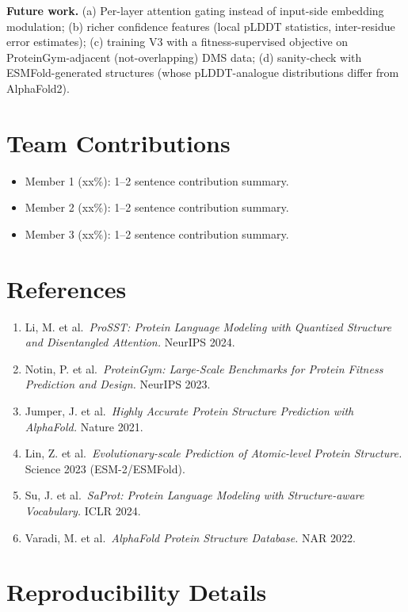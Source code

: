\documentclass[11pt,a4paper]{article}
\begin{document}
\textbf{Future work.} (a) Per-layer attention gating instead of input-side
embedding modulation; (b) richer confidence features (local pLDDT
statistics, inter-residue error estimates); (c) training V3 with a
fitness-supervised objective on ProteinGym-adjacent (not-overlapping)
DMS data; (d) sanity-check with ESMFold-generated structures (whose
pLDDT-analogue distributions differ from AlphaFold2).

\section*{Team Contributions}
\begin{itemize}[leftmargin=*]
    \item Member 1 (xx\%): 1--2 sentence contribution summary.
    \item Member 2 (xx\%): 1--2 sentence contribution summary.
    \item Member 3 (xx\%): 1--2 sentence contribution summary.
\end{itemize}

\section*{References}
\begin{enumerate}[leftmargin=*, itemsep=0pt]
    \item Li, M. et al.\ \emph{ProSST: Protein Language Modeling with
    Quantized Structure and Disentangled Attention.} NeurIPS 2024.
    \item Notin, P. et al.\ \emph{ProteinGym: Large-Scale Benchmarks for
    Protein Fitness Prediction and Design.} NeurIPS 2023.
    \item Jumper, J. et al.\ \emph{Highly Accurate Protein Structure
    Prediction with AlphaFold.} Nature 2021.
    \item Lin, Z. et al.\ \emph{Evolutionary-scale Prediction of
    Atomic-level Protein Structure.} Science 2023 (ESM-2/ESMFold).
    \item Su, J. et al.\ \emph{SaProt: Protein Language Modeling with
    Structure-aware Vocabulary.} ICLR 2024.
    \item Varadi, M. et al.\ \emph{AlphaFold Protein Structure Database.}
    NAR 2022.
\end{enumerate}

\appendix
\section{Reproducibility Details}
\end{document}
